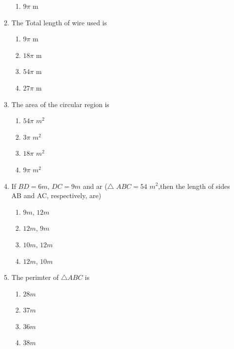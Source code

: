 \documentclass[11pt]{article}
\begin{document}
\begin{enumerate}
\begin{enumerate}[label=(\roman*)]
\begin{enumerate}[label=(\Alph*)]
					\item $9\pi$ m
				\end{enumerate}
			\item The Total length of wire used is
				\begin{enumerate}[label=(\Alph*)]
					\item $9\pi$ m
					\item ${18}\pi$ m
					\item ${54}\pi$ m
					\item ${27}\pi$ m
				\end{enumerate}
			\item The area of the circular region is
				\begin{enumerate}[label=(\Alph*)]
					\item ${54}\pi$ $m^2$
					\item ${3}\pi$ $m^2$
					\item ${18}\pi$ $m^2$
					\item ${9}\pi$ $m^2$
				\end{enumerate}
			\item If $BD = 6 m$, $DC = 9 m$ and ar ($\triangle$ $ABC = 54$ $m^2$,then the length of sides AB and AC, respectively, are)
				\begin{enumerate}[label=(\Alph*)]
					\item $9 m$, $12 m$
					\item $12 m$, $9 m$
					\item $10 m$, $12 m$
					\item $12 m$, $10 m$
				\end{enumerate}
			\item The perimter of $\triangle ABC$ is
				\begin{enumerate}[label=(\Alph*)]
					\item $28 m$
					\item $37 m$
					\item $36 m$
					\item $38 m$
				\end{enumerate}
		\end{enumerate}		
\end{enumerate}
\end{document}
